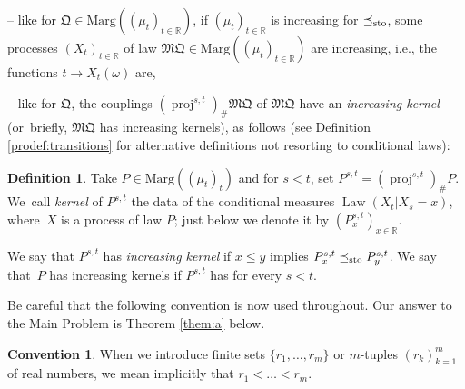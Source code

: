 \documentclass[11pt]{article}
\newcommand{\ie}{i.e.,\xspace}
\theoremstyle{plain}
\theoremstyle{definition}
\newtheorem{defi}[them]{Definition}
\newtheorem{convention}[them]{Convention}
\newcommand{\como}{\mathfrak{Q}}
\newcommand{\mq}{\mathfrak{MQ}}
\newcommand{\ma}{\mathrm{Marg}}
\newcommand{\R}{\mathbb{R}}
\newcommand{\law}{\operatorname{Law}}
\newcommand{\leqs}{\preceq_{\text{\rm sto}}}
\newcommand{\pr}{\operatorname{proj}}
\begin{document}
-- like for $\como\in \ma((\mu_t)_{t\in \R})$, if $(\mu_t)_{t\in \R}$ is increasing for $\leqs$, some processes $(X_t)_{t\in\R}$ of law $\mq\in \ma((\mu_t)_{t\in \R})$ are increasing, \ie the functions $t\to X_t(\omega)$ are,

-- like for $\como$, the couplings $(\pr^{s,t})_\#\mq$ of $\mq$ have an \emph{increasing kernel} (or~briefly, $\mq$ has increasing kernels), as follows (see Definition \ref{prodef:transitions} for alternative definitions not resorting to conditional laws):

\begin{defi}\label{defi:increasing_kernel_intro}Take $P\in\ma((\mu_t)_t)$ and for $s<t$, set $P^{s,t}=(\pr^{s,t})_\#P$. We~call \emph{kernel} of $P^{s,t}$ the data of the conditional measures $\law(X_t|X_{s}=x)$, where~$X$ is a process of law $P$; just below we denote it by $(P^{s,t}_x)_{x\in \R}$.

We say that $P^{s,t}$ has \emph{increasing kernel} if $x\leqslant y$ implies $P^{s,t}_x\leqs P^{s,t}_y$. We say that~$P$ has increasing kernels if $P^{s,t}$ has for every $s< t$.
\end{defi}

Be careful that the following convention is now used throughout. Our answer to the Main Problem is Theorem \ref{them:a} below.

\begin{convention}\label{conv:croissant}When we introduce finite sets $\{r_1,\ldots,r_m\}$ or $m$-tuples $(r_k)^m_{k=1}$ of real numbers, we mean implicitly that $r_1<\ldots<r_m$.
\end{convention}
\end{document}
